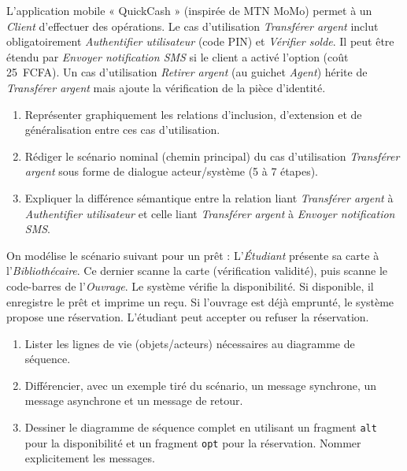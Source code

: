 \documentclass[11pt]{article}
\begin{document}
\begin{exercice}
L'application mobile « QuickCash » (inspirée de MTN MoMo) permet à un \textit{Client} d'effectuer des opérations. Le cas d'utilisation \textit{Transférer argent} inclut obligatoirement \textit{Authentifier utilisateur} (code PIN) et \textit{Vérifier solde}. Il peut être étendu par \textit{Envoyer notification SMS} si le client a activé l'option (coût \SI{25}{FCFA}). Un cas d'utilisation \textit{Retirer argent} (au guichet \textit{Agent}) hérite de \textit{Transférer argent} mais ajoute la vérification de la pièce d'identité.
\begin{enumerate}
    \item Représenter graphiquement les relations d'inclusion, d'extension et de généralisation entre ces cas d'utilisation.
    \item Rédiger le scénario nominal (chemin principal) du cas d'utilisation \textit{Transférer argent} sous forme de dialogue acteur/système (5 à 7 étapes).
    \item Expliquer la différence sémantique entre la relation liant \textit{Transférer argent} à \textit{Authentifier utilisateur} et celle liant \textit{Transférer argent} à \textit{Envoyer notification SMS}.
\end{enumerate}
\end{exercice}

\begin{exercice}
On modélise le scénario suivant pour un prêt : L'\textit{Étudiant} présente sa carte à l'\textit{Bibliothécaire}. Ce dernier scanne la carte (vérification validité), puis scanne le code-barres de l'\textit{Ouvrage}. Le système vérifie la disponibilité. Si disponible, il enregistre le prêt et imprime un reçu. Si l'ouvrage est déjà emprunté, le système propose une réservation. L'étudiant peut accepter ou refuser la réservation.
\begin{enumerate}
    \item Lister les lignes de vie (objets/acteurs) nécessaires au diagramme de séquence.
    \item Différencier, avec un exemple tiré du scénario, un message synchrone, un message asynchrone et un message de retour.
    \item Dessiner le diagramme de séquence complet en utilisant un fragment \texttt{alt} pour la disponibilité et un fragment \texttt{opt} pour la réservation. Nommer explicitement les messages.
\end{enumerate}
\end{exercice}
\end{document}
